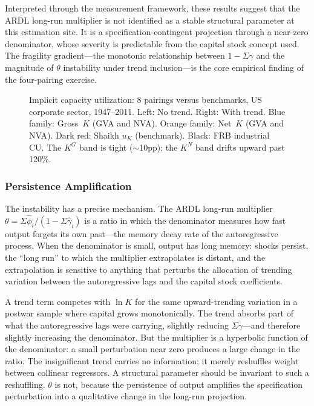 \documentclass[11pt,a4paper]{article}
\begin{document}
Interpreted through the measurement framework, these results suggest that the ARDL long-run multiplier is not identified as a stable structural parameter at this estimation site. It is a specification-contingent projection through a near-zero denominator, whose severity is predictable from the capital stock concept used. The fragility gradient---the monotonic relationship between $1 - \Sigma\gamma$ and the magnitude of $\theta$ instability under trend inclusion---is the core empirical finding of the four-pairing exercise.


\begin{figure}[!ht]
	\centering
	\caption{Implicit capacity utilization: 8 pairings versus benchmarks, US corporate sector, 1947--2011. Left: No trend. Right: With trend. Blue family: Gross~$K$ (GVA and NVA). Orange family: Net~$K$ (GVA and NVA). Dark red: Shaikh $u_K$ (benchmark). Black: FRB industrial CU. The $K^G$ band is tight ($\sim$10pp); the $K^N$ band drifts upward past 120\%.}
	\label{fig:S0_8pairings}
\end{figure}


\subsubsection{Persistence Amplification}

The instability has a precise mechanism. The ARDL long-run multiplier $\theta = \Sigma\hat{\phi}_i / (1 - \Sigma\hat{\gamma}_i)$ is a ratio in which the denominator measures how fast output forgets its own past---the memory decay rate of the autoregressive process. When the denominator is small, output has long memory: shocks persist, the ``long run'' to which the multiplier extrapolates is distant, and the extrapolation is sensitive to anything that perturbs the allocation of trending variation between the autoregressive lags and the capital stock coefficients.

A trend term competes with $\ln K$ for the same upward-trending variation in a postwar sample where capital grows monotonically. The trend absorbs part of what the autoregressive lags were carrying, slightly reducing $\Sigma\gamma$---and therefore slightly increasing the denominator. But the multiplier is a hyperbolic function of the denominator: a small perturbation near zero produces a large change in the ratio. The insignificant trend carries no information; it merely reshuffles weight between collinear regressors. A structural parameter should be invariant to such a reshuffling. $\theta$ is not, because the persistence of output amplifies the specification perturbation into a qualitative change in the long-run projection.
\end{document}
